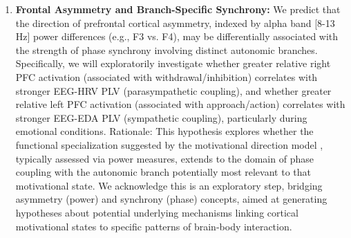 \documentclass[12pt]{article} %
\begin{document}
\begin{enumerate}[label=(\alph*)]
    \item \textbf{Frontal Asymmetry and Branch-Specific Synchrony:} We predict that the direction of prefrontal cortical asymmetry, indexed by alpha band [8-13 Hz] power differences (e.g., F3 vs. F4), may be differentially associated with the strength of phase synchrony involving distinct autonomic branches. Specifically, we will exploratorily investigate whether greater relative right \gls{PFC} activation (associated with withdrawal/inhibition) correlates with stronger \gls{EEG}-\gls{HRV} \gls{PLV} (parasympathetic coupling), and whether greater relative left \gls{PFC} activation (associated with approach/action) correlates with stronger \gls{EEG}-\gls{EDA} \gls{PLV} (sympathetic coupling), particularly during emotional conditions. Rationale: This hypothesis explores whether the functional specialization suggested by the motivational direction model \parencite{davidsonWhatDoesPrefrontal2004, harmon-jonesAngerFrontalBrain1996}, typically assessed via power measures, extends to the domain of phase coupling with the autonomic branch potentially most relevant to that motivational state. We acknowledge this is an exploratory step, bridging asymmetry (power) and synchrony (phase) concepts, aimed at generating hypotheses about potential underlying mechanisms linking cortical motivational states to specific patterns of brain-body interaction.
\end{enumerate}
\end{document}
